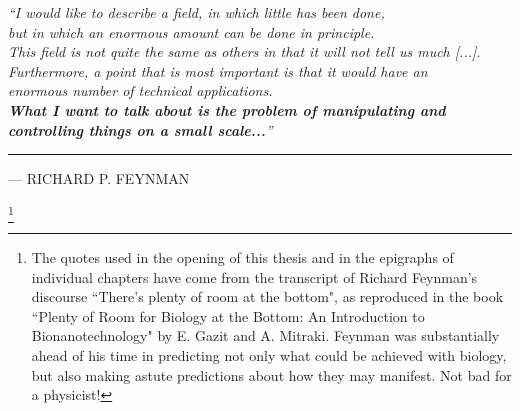 \documentclass[a4paper, oneside, 11pt]{report} %
\makeatletter
\newcommand\markerlessfootnote[1]{%
  \begingroup
  \makeatletter
  \renewcommand\footnoterule{%
    \kern-3\p@
    \hrule\@width \textwidth
    \kern2/6\p@}
    \makeatother
  \renewcommand\thefootnote{}\footnote{#1}%
  \addtocounter{footnote}{-1}%
  \endgroup
}
\newlength\longest
\makeatother
\begin{document}
\newpage

\thispagestyle{empty}
\null\vfill
\settowidth{}
\begin{center}
\parbox{\longest}{%
 \raggedright{\large \itshape%
   ``I would like to describe a field, in which little has been done, \\
   but in which an enormous amount can be done in principle. \\[2ex]
   This field is not quite the same as others in that it will not tell us much [...]. \\
   Furthermore, a point that is most important is that it would have an \\
   enormous number of technical applications.\\[2ex]


   \large \textbf{What I want to talk about is the problem of manipulating and controlling
   things on a small scale...}'' \par\vspace{0.35cm}\hrule\bigskip
   }
   \raggedleft\Large\MakeUppercase{--- Richard P. Feynman}\par%
}
\end{center}
\vfill

\markerlessfootnote{The quotes used in the opening of this thesis and in the epigraphs of individual chapters have come from the transcript of Richard Feynman's discourse ``There's plenty of room at the bottom", as reproduced in the book ``Plenty of Room for Biology at the Bottom: An Introduction to Bionanotechnology" by E. Gazit and A. Mitraki. Feynman was substantially ahead of his time in predicting not only what could be achieved with biology, but also making astute predictions about how they may manifest. Not bad for a physicist!}
\clearpage

\newpage
\end{document}
